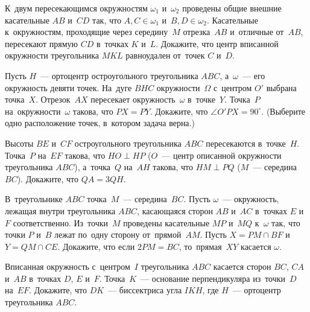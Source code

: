 


\begin{problems}

\item
К~двум пересекающимся окружностям $\omega_{1}$ и~$\omega_{2}$ проведены общие
внешние касательные $AB$ и~$CD$ так, что $A, C \in \omega_{1}$
и~$B, D \in \omega_{2}$.
Касательные к~окружностям, проходящие через середину~$M$ отрезка~$AB$
и~отличные от~$AB$, пересекают прямую $CD$ в~точках $K$ и~$L$.
Докажите, что центр вписанной окружности треугольника $MKL$ равноудален
от~точек $C$ и~$D$.

\item
Пусть $H$~--- ортоцентр остроугольного треугольника $ABC$, а~$\omega$~---
его окружность девяти точек.
На~дуге $BHC$ окружности~$\Omega$ с~центром $O'$ выбрана точка~$X$.
Отрезок~$AX$ пересекает окружность~$\omega$ в~точке~$Y$.
Точка~$P$ на~окружности~$\omega$ такова, что $PX = PY$.
Докажите, что $\angle O'PX = 90^\circ$.
(Выберите одно расположение точек, в~котором задача верна.)

\item
Высоты $BE$ и~$CF$ остроугольного треугольника $ABC$ пересекаются в~точке~$H$.
Точка~$P$ на~$EF$ такова, что $HO \perp HP$
($O$~--- центр описанной окружности треугольника $ABC$),
а~точка~$Q$ на~$AH$ такова, что $HM \perp PQ$ ($M$~--- середина~$BC$).
Докажите, что $QA = 3 QH$.

\item
В~треугольнике $ABC$ точка~$M$~--- середина~$BC$.
Пусть $\omega$~--- окружность, лежащая внутри треугольника $ABC$, касающаяся
сторон $AB$ и~$AC$ в~точках $E$ и~$F$ соответственно.
Из~точки~$M$ проведены касательные $MP$ и~$MQ$ к~$\omega$ так, что
точки $P$ и~$B$ лежат по~одну сторону от~прямой~$AM$.
Пусть $X = PM \cap BF $ и~$Y = QM \cap CE$.
Докажите, что если $2 PM = BC$, то~прямая~$XY$ касается $\omega$.

\item
Вписанная окружность с~центром~$I$ треугольника $ABC$ касается
сторон $BC$, $CA$ и~$AB$ в~точках $D$, $E$ и~$F$.
Точка~$K$~--- основание перпендикуляра из~точки~$D$ на~$EF$.
Докажите, что $DK$~--- биссектриса угла $IKH$, где $H$~--- ортоцентр
треугольника $ABC$.


\end{problems}

